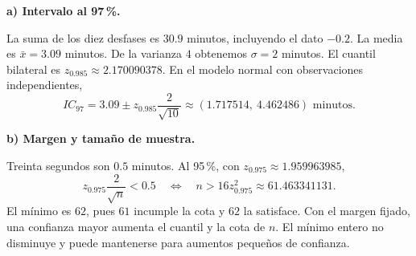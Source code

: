 \textbf{a) Intervalo al 97\,\%.}\par\nopagebreak[4]
La suma de los diez desfases es $30.9$ minutos, incluyendo el dato $-0.2$. La media es $\bar x=3.09$ minutos. De la varianza $4$ obtenemos $\sigma=2$ minutos. El cuantil bilateral es $z_{0.985}\approx2.170090378$. En el modelo normal con observaciones independientes,
\[
IC_{97}=3.09\pm z_{0.985}\frac2{\sqrt{10}}
\approx\boxed{(1.717514,\ 4.462486)\text{ minutos}.}
\]

\textbf{b) Margen y tamaño de muestra.}\par\nopagebreak[4]
Treinta segundos son $0.5$ minutos. Al 95\,\%, con $z_{0.975}\approx1.959963985$,
\[
z_{0.975}\frac2{\sqrt n}<0.5
\quad\Longleftrightarrow\quad n>16z_{0.975}^2\approx61.463341131.
\]
El mínimo es $\boxed{62}$, pues $61$ incumple la cota y $62$ la satisface. Con el margen fijado, una confianza mayor aumenta el cuantil y la cota de $n$. El mínimo entero no disminuye y puede mantenerse para aumentos pequeños de confianza.

